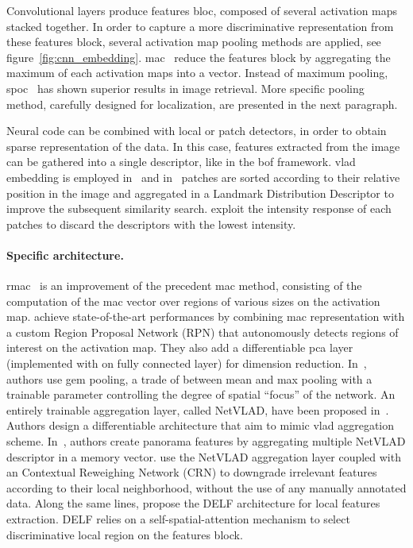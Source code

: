 Convolutional layers produce features bloc, composed of several activation maps stacked together. In order to capture a more discriminative representation from these features block, several activation map pooling methods are applied, see figure~\ref{fig:cnn_embedding}. \ac{mac}~\citep{Razavian2014a} reduce the features block by aggregating the maximum of each activation maps into a vector. Instead of maximum pooling, \ac{spoc}~\citep{Babenko2015} has shown superior results in image retrieval. More specific pooling method, carefully designed for localization, are presented in the next paragraph.

Neural code can be combined with local or patch detectors, in order to obtain sparse representation of the data. In this case, features extracted from the image can be gathered into a single descriptor, like in the \ac{bof} framework. \ac{vlad} embedding is employed in~\citep{Yan2016} and in~\citep{Panphattarasap2016} patches are sorted according to their relative position in the image and aggregated in a Landmark Distribution Descriptor to improve the subsequent similarity search. \citet{Zhi2016} exploit the intensity response of each patches to discard the descriptors with the lowest intensity.

%

\paragraph{Specific architecture.} \label{subsubsec:cnn_aggregation}
\ac{rmac}~\citep{Tolias2016} is an improvement of the precedent \ac{mac} method, consisting of the computation of the \ac{mac} vector over regions of various sizes on the activation map. \citet{Gordo2017} achieve state-of-the-art performances by combining \ac{mac} representation with a custom Region Proposal Network (RPN) that autonomously detects regions of interest on the activation map. They also add a differentiable \ac{pca} layer (implemented with on fully connected layer) for dimension reduction. In~\citep{Radenovic2017}, authors use \ac{gem} pooling, a trade of between mean and max pooling with a trainable parameter controlling the degree of spatial ``focus'' of the network. An entirely trainable aggregation layer, called NetVLAD, have been proposed in~\citep{Arandjelovic2017}. Authors design a differentiable architecture that aim to mimic \ac{vlad} aggregation scheme. In~\citep{Iscen2017}, authors create panorama features by aggregating multiple NetVLAD descriptor in a memory vector. \citet{Kim2017a} use the NetVLAD aggregation layer coupled with an Contextual Reweighing Network (CRN) to downgrade irrelevant features according to their local neighborhood, without the use of any manually annotated data. Along the same lines, \citet{Noh2017} propose the DELF architecture for local features extraction. DELF relies on a self-spatial-attention mechanism to select discriminative local region on the features block. 

